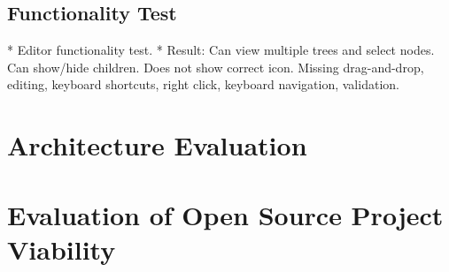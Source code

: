 \subsection{Functionality Test}
* Editor functionality test.
  * Result: Can view multiple trees and select nodes. Can show/hide children. Does not show correct icon. Missing drag-and-drop, editing, keyboard shortcuts, right click, keyboard navigation, validation.

\section{Architecture Evaluation}

\section{Evaluation of Open Source Project Viability}


